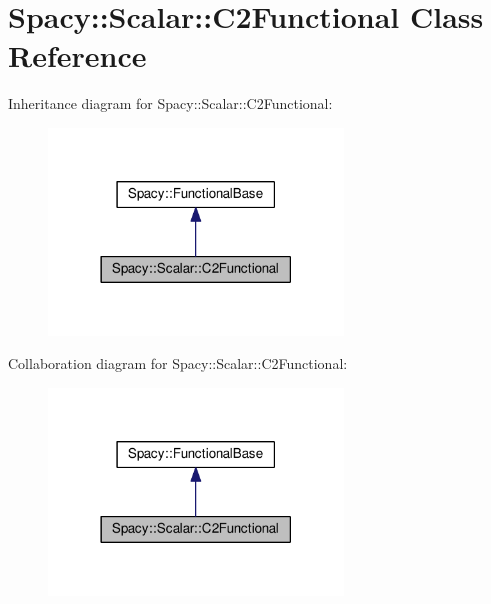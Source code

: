 \hypertarget{classSpacy_1_1Scalar_1_1C2Functional}{}\section{Spacy\+:\+:Scalar\+:\+:C2\+Functional Class Reference}
\label{classSpacy_1_1Scalar_1_1C2Functional}


Inheritance diagram for Spacy\+:\+:Scalar\+:\+:C2\+Functional\+:
\nopagebreak
\begin{figure}[H]
\begin{center}
\leavevmode
\includegraphics[width=222pt]{classSpacy_1_1Scalar_1_1C2Functional__inherit__graph}
\end{center}
\end{figure}


Collaboration diagram for Spacy\+:\+:Scalar\+:\+:C2\+Functional\+:
\nopagebreak
\begin{figure}[H]
\begin{center}
\leavevmode
\includegraphics[width=222pt]{classSpacy_1_1Scalar_1_1C2Functional__coll__graph}
\end{center}
\end{figure}
